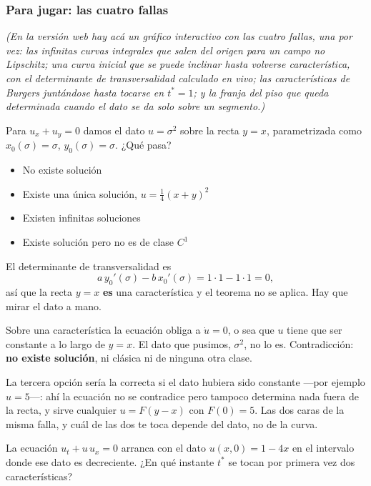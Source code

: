 \documentclass[
  spanish,
  a4paper,
]{scrbook}
\providecommand{\tightlist}{%
  \setlength{\itemsep}{0pt}\setlength{\parskip}{0pt}}
\theoremstyle{definition}
\theoremstyle{plain}
\theoremstyle{definition}
\theoremstyle{plain}
\theoremstyle{definition}
\theoremstyle{remark}
\begin{document}
\subsubsection{Para jugar: las cuatro
fallas}\label{sec-lienzo-patologias}

\emph{(En la versión web hay acá un gráfico interactivo con las cuatro
fallas, una por vez: las infinitas curvas integrales que salen del
origen para un campo no Lipschitz; una curva inicial que se puede
inclinar hasta volverse característica, con el determinante de
transversalidad calculado en vivo; las características de Burgers
juntándose hasta tocarse en \(t^{*}=1\); y la franja del piso que queda
determinada cuando el dato se da solo sobre un segmento.)}

Para \(u_x + u_y = 0\) damos el dato \(u = \sigma^{2}\) sobre la recta
\(y = x\), parametrizada como \(x_0(\sigma)=\sigma\),
\(y_0(\sigma)=\sigma\). ¿Qué pasa?

\begin{itemize}
\tightlist
\item
  {No existe solución}
\item
  {Existe una única solución, \(u = \tfrac14(x+y)^2\)}
\item
  {Existen infinitas soluciones}
\item
  {Existe solución pero no es de clase \(C^1\)}
\end{itemize}

El determinante de transversalidad es \[
a\,y_0'(\sigma) - b\,x_0'(\sigma) = 1\cdot 1 - 1\cdot 1 = 0 ,
\] así que la recta \(y=x\) \textbf{es} una característica y el teorema
no se aplica. Hay que mirar el dato a mano.

Sobre una característica la ecuación obliga a \(\dot u = 0\), o sea que
\(u\) tiene que ser constante a lo largo de \(y=x\). El dato que
pusimos, \(\sigma^2\), no lo es. Contradicción: \textbf{no existe
solución}, ni clásica ni de ninguna otra clase.

La tercera opción sería la correcta si el dato hubiera sido constante
---por ejemplo \(u=5\)---: ahí la ecuación no se contradice pero tampoco
determina nada fuera de la recta, y sirve cualquier \(u = F(y-x)\) con
\(F(0)=5\). Las dos caras de la misma falla, y cuál de las dos te toca
depende del dato, no de la curva.

La ecuación \(u_t + u\,u_x = 0\) arranca con el dato \(u(x,0) = 1 - 4x\)
en el intervalo donde ese dato es decreciente. ¿En qué instante
\(t^{*}\) se tocan por primera vez dos características?
\end{document}
